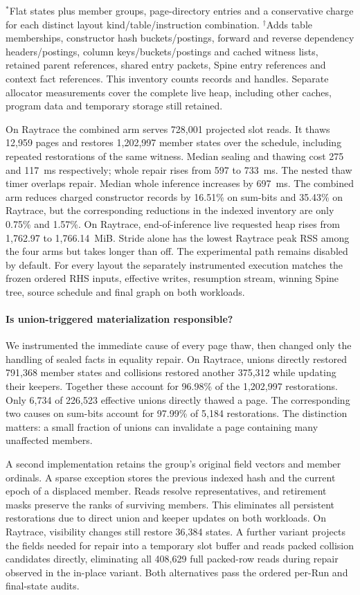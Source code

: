 $^*$Flat states plus member groups, page-directory entries and a conservative charge for each distinct layout kind/table/instruction combination. $^\dagger$Adds table memberships, constructor hash buckets/postings, forward and reverse dependency headers/postings, column keys/buckets/postings and cached witness lists, retained parent references, shared entry packets, Spine entry references and context fact references. This inventory counts records and handles. Separate allocator measurements cover the complete live heap, including other caches, program data and temporary storage still retained.

On Raytrace the combined arm serves 728,001 projected slot reads. It thaws 12,959 pages and restores 1,202,997 member states over the schedule, including repeated restorations of the same witness. Median sealing and thawing cost 275 and 117~ms respectively; whole repair rises from 597 to 733~ms. The nested thaw timer overlaps repair. Median whole inference increases by 697~ms. The combined arm reduces charged constructor records by 16.51\% on sum-bits and 35.43\% on Raytrace, but the corresponding reductions in the indexed inventory are only 0.75\% and 1.57\%. On Raytrace, end-of-inference live requested heap rises from 1,762.97 to 1,766.14~MiB. Stride alone has the lowest Raytrace peak RSS among the four arms but takes longer than off. The experimental path remains disabled by default. For every layout the separately instrumented execution matches the frozen ordered RHS inputs, effective writes, resumption stream, winning Spine tree, source schedule and final graph on both workloads.

\paragraph{Is union-triggered materialization responsible?}
We instrumented the immediate cause of every page thaw, then changed only the handling of sealed facts in equality repair. On Raytrace, unions directly restored 791,368 member states and collisions restored another 375,312 while updating their keepers. Together these account for 96.98\% of the 1,202,997 restorations. Only 6,734 of 226,523 effective unions directly thawed a page. The corresponding two causes on sum-bits account for 97.99\% of 5,184 restorations. The distinction matters: a small fraction of unions can invalidate a page containing many unaffected members.

A second implementation retains the group's original field vectors and member ordinals. A sparse exception stores the previous indexed hash and the current epoch of a displaced member. Reads resolve representatives, and retirement masks preserve the ranks of surviving members. This eliminates all persistent restorations due to direct union and keeper updates on both workloads. On Raytrace, visibility changes still restore 36,384 states. A further variant projects the fields needed for repair into a temporary slot buffer and reads packed collision candidates directly, eliminating all 408,629 full packed-row reads during repair observed in the in-place variant. Both alternatives pass the ordered per-Run and final-state audits.


